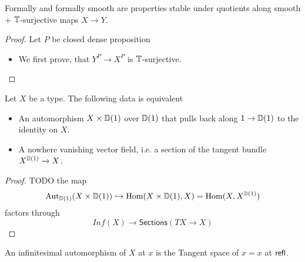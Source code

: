 \begin{lemma}
	Formally \etale and formally smooth are properties stable under quotients along smooth + $\mathbb{T}$-surjective maps $X \to Y$.
\end{lemma}
\begin{proof}
	Let $P$ be closed dense proposition
\begin{itemize}
	\item 	We first prove, that $Y^{P} \to X^P$ is $\mathbb{T}$-surjective. 
	
\end{itemize}

	
\end{proof}


\begin{lemma}[TODO]
	Let $X$ be a type. The following data is equivalent
	\begin{itemize}
		\item An automorphism $X \times \mathbb{D}(1)$ over $\mathbb{D}(1)$ that pulls back along $1 \to \mathbb{D}(1)$ to the identity on $X$.
		\item A nowhere vanishing vector field, i.e. a section of the tangent bundle $X^{\mathbb{D}(1)} \to X$.
	\end{itemize}
\end{lemma}
\begin{proof}
	TODO
	the map
	\[
	\operatorname{Aut}_{\mathbb{D}(1)}(X \times \mathbb{D}(1)) \hookrightarrow \operatorname{Hom}(X \times \mathbb{D}(1) , X) = \operatorname{Hom}(X , X^{\mathbb{D}(1)})
	\]
	factors through 
	\[
	Inf(X) \to \mathsf{Sections} (T X \to X)
	\]
\end{proof}

\begin{definition}
	An infinitesimal automorphism of $X$ at $x$ is the Tangent space of $x = x$ at $\mathsf{refl}$.
\end{definition}